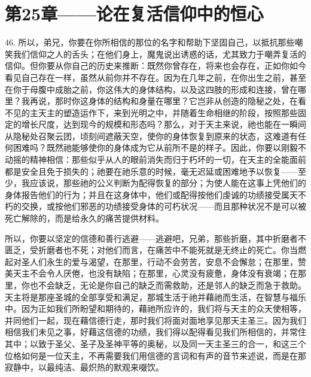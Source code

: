 
\section{第25章——论在复活信仰中的恒心}

46. 所以，弟兄，你要在你所相信的那位的名字和帮助下坚固自己，以抵抗那些嘲笑我们信仰之人的舌头；在他们身上，魔鬼说出诱惑的话，尤其致力于嘲弄复活的信仰。但你要从你自己的历史来推断：既然你曾存在，将来也会存在，正如你如今看见自己存在一样，虽然从前你并不存在。因为在几年之前，在你出生之前，甚至在你于母腹中成胎之前，你这伟大的身体结构，以及这四肢的形成和连接，曾在哪里？我再说，那时你这身体的结构和身量在哪里？它岂非从创造的隐秘之处，在看不见的主天主的塑造运作下，来到光明之中，并随着生命相继的阶段，按照那些固定的增长尺度，达到现今的规模和形态吗？那么，对于天主来说，祂也能在一瞬间从隐秘处召聚云团，顷刻间遮蔽天空，使你的身体恢复到原来的状态，这难道有任何困难吗？既然祂能够使你的身体成为它从前所不是的样子。因此，你要以刚毅不动摇的精神相信：那些似乎从人的眼前消失而归于朽坏的一切，在天主的全能面前都是安全且免于损失的；祂要在祂乐意的时候，毫无迟延或困难地予以恢复——至少，我应该说，那些祂的公义判断为配得恢复的部分；为使人能在这事上凭他们的身体报告他们的行为；并且在这身体中，他们或配得按他们虔诚的功绩接受属天不朽的交换，或按他们邪恶的功绩接受身体的可朽状况——而且那种状况不是可以被死亡解除的，而是给永久的痛苦提供材料。\par

所以，你要以坚定的信德和善行逃避——逃避吧，兄弟，那些折磨，其中折磨者不匮乏，受折磨者也不死；对他们而言，在痛苦中不能死就是无终止的死亡。你当燃起对圣人们永生的爱与渴望，在那里，行动不会劳苦，安息不会懈怠；在那里，赞美天主不会令人厌倦，也没有缺陷；在那里，心灵没有疲惫，身体没有衰竭；在那里，你也不会缺乏，无论是你自己的缺乏而需救助，还是邻人的缺乏而急于救助。天主将是那座圣城的全部享受和满足，那城生活于祂并藉祂而生活，在智慧与福乐中。因为正如我们所盼望和期待的，藉祂所应许的，我们将与天主的众天使相等，并同他们一起，现在藉信德行走，那时我们将面对面地享见那天主圣三。因为我们相信我们未见之事，好藉这信德的功绩，我们得以配得看见我们所相信的，并常住其中；以致于圣父、圣子及圣神平等的奥秘，以及同一天主圣三的合一，和这三个位格如何是一位天主，不再需要我们用信德的言词和有声的音节来述说，而是在那寂静中，以最纯洁、最炽热的默观来啜饮。\par


